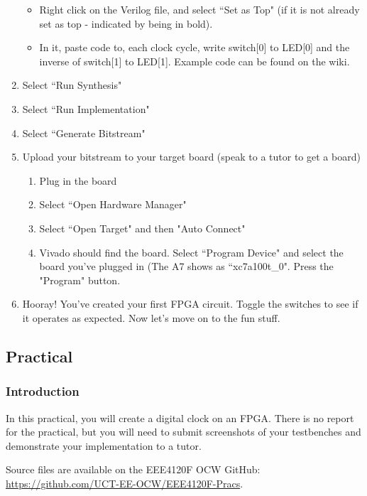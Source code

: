 \begin{enumerate}
\begin{itemize}
        \item Right click on the Verilog file, and select ``Set as Top" (if it is not already set as top - indicated by being in bold).
        \item In it, paste code to, each clock cycle, write switch[0] to LED[0] and the inverse of switch[1] to LED[1]. Example code can be found on the wiki.
    \end{itemize}
    \item Select ``Run Synthesis"
    \item Select ``Run Implementation"
    \item Select ``Generate Bitstream"
    \item Upload your bitstream to your target board (speak to a tutor to get a board)
    \begin{enumerate}
        \item Plug in the board
        \item Select ``Open Hardware Manager"
        \item Select ``Open Target" and then "Auto Connect"
        \item Vivado should find the board. Select ``Program Device" and select the board you've plugged in (The A7 shows as ``xc7a100t\_0". Press the "Program" button.
    \end{enumerate}
    \item Hooray! You've created your first FPGA circuit. Toggle the switches to see if it operates as expected. Now let's move on to the fun stuff.
\end{enumerate}

\subsection{Practical}
\subsubsection{Introduction}
In this practical, you will create a digital clock on an FPGA. There is no report for the practical, but you will need to submit screenshots of your testbenches and demonstrate your implementation to a tutor.

Source files are available on the EEE4120F OCW GitHub: \href{https://github.com/UCT-EE-OCW/EEE4120F-Pracs}{https://github.com/UCT-EE-OCW/EEE4120F-Pracs}.


